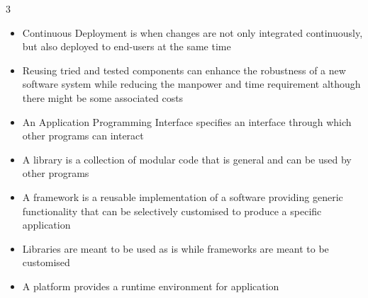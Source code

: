 \documentclass[10pt, landscape]{article}
\begin{document}
\begin{multicols*}{3}
\begin{itemize}
    \item Continuous Deployment is when changes are not only integrated continuously, but also deployed to end-users at the same time
    \item Reusing tried and tested components can enhance the robustness of a new software system while reducing the manpower and time requirement although there might be some associated costs
    \item An Application Programming Interface specifies an interface through which other programs can interact
    \item A library is a collection of modular code that is general and can be used by other programs
    \item A framework is a reusable implementation of a software providing generic functionality that can be selectively customised to produce a specific application
    \item Libraries are meant to be used as is while frameworks are meant to be customised
    \item A platform provides a runtime environment for application
\end{itemize}


\end{multicols*}
\end{document}

